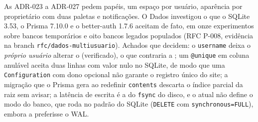 {As ADR-023 a ADR-027 pedem papéis, um espaço por usuário, aparência por proprietário com duas paletas e notificações. O Dados investigou o que o SQLite 3.53, o Prisma 7.10.0 e o better-auth 1.7.6 aceitam de fato, em onze experimentos sobre bancos temporários e oito bancos legados populados (RFC P-008, evidência na branch \texttt{rfc/dados-multiusuario}). Achados que decidem: o  \texttt{username} deixa o \emph{próprio usuário} alterar o  (verificado), o que contraria a ; um \texttt{@unique} em coluna anulável aceita duas linhas com valor nulo no SQLite, de modo que uma \texttt{Configuration} com dono opcional não garante o registro único do site; a migração que o Prisma gera ao redefinir \texttt{contents} descarta o índice parcial da raiz sem avisar; a latência de escrita é a do \texttt{fsync} do disco, e o  atual não define o modo do banco, que roda no padrão do SQLite (\texttt{DELETE} com \texttt{synchronous=FULL}), embora a  preferisse o WAL.}
